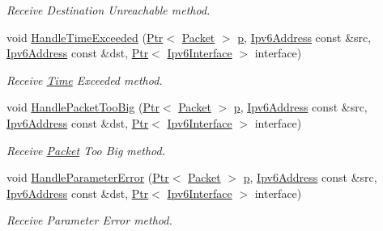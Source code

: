 \begin{DoxyCompactItemize}
\begin{DoxyCompactList}\small\item\em Receive Destination Unreachable method. \end{DoxyCompactList}\item 
void \hyperlink{classns3_1_1Icmpv6L4Protocol_ab83a1f9bbf51d2df18d893bb8b2f37ab}{Handle\+Time\+Exceeded} (\hyperlink{classns3_1_1Ptr}{Ptr}$<$ \hyperlink{classns3_1_1Packet}{Packet} $>$ \hyperlink{lte__link__budget__x2__handover__measures_8m_ac9de518908a968428863f829398a4e62}{p}, \hyperlink{classns3_1_1Ipv6Address}{Ipv6\+Address} const \&src, \hyperlink{classns3_1_1Ipv6Address}{Ipv6\+Address} const \&dst, \hyperlink{classns3_1_1Ptr}{Ptr}$<$ \hyperlink{classns3_1_1Ipv6Interface}{Ipv6\+Interface} $>$ interface)
\begin{DoxyCompactList}\small\item\em Receive \hyperlink{classns3_1_1Time}{Time} Exceeded method. \end{DoxyCompactList}\item 
void \hyperlink{classns3_1_1Icmpv6L4Protocol_a5508e43a5549288270fc050b8b072f51}{Handle\+Packet\+Too\+Big} (\hyperlink{classns3_1_1Ptr}{Ptr}$<$ \hyperlink{classns3_1_1Packet}{Packet} $>$ \hyperlink{lte__link__budget__x2__handover__measures_8m_ac9de518908a968428863f829398a4e62}{p}, \hyperlink{classns3_1_1Ipv6Address}{Ipv6\+Address} const \&src, \hyperlink{classns3_1_1Ipv6Address}{Ipv6\+Address} const \&dst, \hyperlink{classns3_1_1Ptr}{Ptr}$<$ \hyperlink{classns3_1_1Ipv6Interface}{Ipv6\+Interface} $>$ interface)
\begin{DoxyCompactList}\small\item\em Receive \hyperlink{classns3_1_1Packet}{Packet} Too Big method. \end{DoxyCompactList}\item 
void \hyperlink{classns3_1_1Icmpv6L4Protocol_ae1ec3272a15fdf3bde7037b86191a365}{Handle\+Parameter\+Error} (\hyperlink{classns3_1_1Ptr}{Ptr}$<$ \hyperlink{classns3_1_1Packet}{Packet} $>$ \hyperlink{lte__link__budget__x2__handover__measures_8m_ac9de518908a968428863f829398a4e62}{p}, \hyperlink{classns3_1_1Ipv6Address}{Ipv6\+Address} const \&src, \hyperlink{classns3_1_1Ipv6Address}{Ipv6\+Address} const \&dst, \hyperlink{classns3_1_1Ptr}{Ptr}$<$ \hyperlink{classns3_1_1Ipv6Interface}{Ipv6\+Interface} $>$ interface)
\begin{DoxyCompactList}\small\item\em Receive Parameter Error method. \end{DoxyCompactList}\item 

\end{DoxyCompactItemize}

